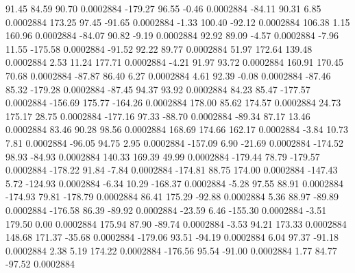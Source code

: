        91.45       84.59       90.70     0.0002884
     -179.27       96.55       -0.46     0.0002884
      -84.11       90.31        6.85     0.0002884
      173.25       97.45      -91.65     0.0002884
       -1.33      100.40      -92.12     0.0002884
      106.38        1.15      160.96     0.0002884
      -84.07       90.82       -9.19     0.0002884
       92.92       89.09       -4.57     0.0002884
       -7.96       11.55     -175.58     0.0002884
      -91.52       92.22       89.77     0.0002884
       51.97      172.64      139.48     0.0002884
        2.53       11.24      177.71     0.0002884
       -4.21       91.97       93.72     0.0002884
      160.91      170.45       70.68     0.0002884
      -87.87       86.40        6.27     0.0002884
        4.61       92.39       -0.08     0.0002884
      -87.46       85.32     -179.28     0.0002884
      -87.45       94.37       93.92     0.0002884
       84.23       85.47     -177.57     0.0002884
     -156.69      175.77     -164.26     0.0002884
      178.00       85.62      174.57     0.0002884
       24.73      175.17       28.75     0.0002884
     -177.16       97.33      -88.70     0.0002884
      -89.34       87.17       13.46     0.0002884
       83.46       90.28       98.56     0.0002884
      168.69      174.66      162.17     0.0002884
       -3.84       10.73        7.81     0.0002884
      -96.05       94.75        2.95     0.0002884
     -157.09        6.90      -21.69     0.0002884
     -174.52       98.93      -84.93     0.0002884
      140.33      169.39       49.99     0.0002884
     -179.44       78.79     -179.57     0.0002884
     -178.22       91.84       -7.84     0.0002884
     -174.81       88.75      174.00     0.0002884
     -147.43        5.72     -124.93     0.0002884
       -6.34       10.29     -168.37     0.0002884
       -5.28       97.55       88.91     0.0002884
     -174.93       79.81     -178.79     0.0002884
       86.41      175.29      -92.88     0.0002884
        5.36       88.97      -89.89     0.0002884
     -176.58       86.39      -89.92     0.0002884
      -23.59        6.46     -155.30     0.0002884
       -3.51      179.50        0.00     0.0002884
      175.94       87.90      -89.74     0.0002884
       -3.53       94.21      173.33     0.0002884
      148.68      171.37      -35.68     0.0002884
     -179.06       93.51      -94.19     0.0002884
        6.04       97.37      -91.18     0.0002884
        2.38        5.19      174.22     0.0002884
     -176.56       95.54      -91.00     0.0002884
        1.77       84.77      -97.52     0.0002884

